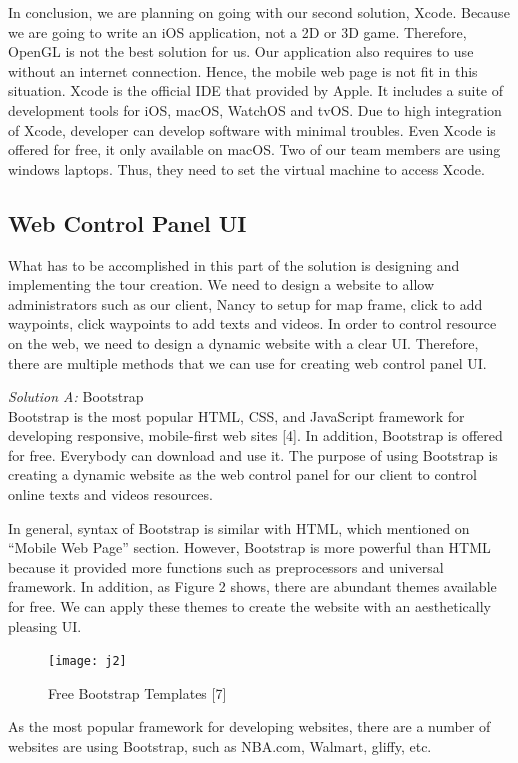 \documentclass[letterpaper, 10pt,titlepage]{article}
\begin{document}
In conclusion, we are planning on going with our second solution, Xcode. Because we are going to write an iOS application, not a 2D or 3D game. Therefore, OpenGL is not the best solution for us. Our application also requires to use without an internet connection. Hence, the mobile web page is not fit in this situation. Xcode is the official IDE that provided by Apple. It includes a suite of development tools for iOS, macOS, WatchOS and tvOS. Due to high integration of Xcode, developer can develop software with minimal troubles. Even Xcode is offered for free, it only available on macOS. Two of our team members are using windows laptops. Thus, they need to set the virtual machine to access Xcode.


\subsection{Web Control Panel UI}
What has to be accomplished in this part of the solution is designing and implementing the tour creation. We need to design a website to allow administrators such as our client, Nancy to setup for map frame, click to add waypoints, click waypoints to add texts and videos. In order to control resource on the web, we need to design a dynamic website with a clear UI. Therefore, there are multiple methods that we can use for creating web control panel UI.


\textit{Solution A:} Bootstrap\\
Bootstrap is the most popular HTML, CSS, and JavaScript framework for developing responsive, mobile-first web sites [4]. In addition, Bootstrap is offered for free. Everybody can download and use it. The purpose of using Bootstrap is creating a dynamic website as the web control panel for our client to control online texts and videos resources. 


In general, syntax of Bootstrap is similar with HTML, which mentioned on “Mobile Web Page” section. However, Bootstrap is more powerful than HTML because it provided more functions such as preprocessors and universal framework. In addition, as Figure 2 shows, there are abundant themes available for free. We can apply these themes to create the website with an aesthetically pleasing UI. 

\begin{figure}[ht]
    \centering
    \texttt{[image: j2]}
    \caption{Free Bootstrap Templates [7]}
    \label{jiawei2}
\end{figure}

As the most popular framework for developing websites, there are a number of websites are using Bootstrap, such as NBA.com, Walmart, gliffy, etc. 
\end{document}
